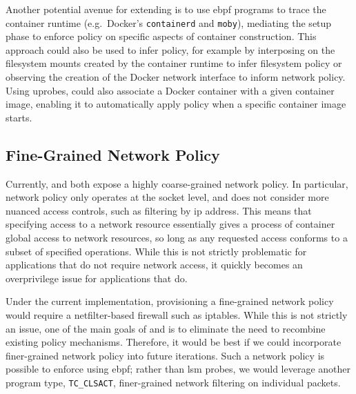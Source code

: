 Another potential avenue for extending \bpfcontain{} is to use \gls{ebpf} programs to
trace the container runtime (e.g.\ Docker's \texttt{containerd} and \texttt{moby}),
mediating the setup phase to enforce policy on specific aspects of container construction.
This approach could also be used to infer policy, for example by interposing on the
filesystem mounts created by the container runtime to infer filesystem policy or observing
the creation of the Docker network interface to inform network policy. Using uprobes,
\bpfcontain{} could also associate a Docker container with a given container image,
enabling it to automatically apply policy when a specific container image starts.


\subsection{Fine-Grained Network Policy}%
\label{ss:disc-fine-grained-network}

Currently, \bpfbox{} and \bpfcontain{} both expose a highly coarse-grained network policy.
In particular, network policy only operates at the socket level, and does not
consider more nuanced access controls, such as filtering by \gls{ip} address. This means
that specifying access to a network resource essentially gives a process of container
global access to network resources, so long as any requested access conforms to a subset
of specified operations. While this is not strictly problematic for applications that do
not require network access, it quickly becomes an overprivilege issue for applications
that do.

Under the current implementation, provisioning a fine-grained network policy would require
a netfilter-based firewall such as iptables. While this is not strictly an issue, one of
the main goals of \bpfbox{} and \bpfcontain{} is to eliminate the need to recombine
existing policy mechanisms. Therefore, it would be best if we could incorporate
finer-grained network policy into future iterations. Such a network policy is possible to
enforce using \gls{ebpf}; rather than \gls{lsm} probes, we would leverage another program
type, \texttt{TC\_CLSACT}, finer-grained network filtering on individual packets.

